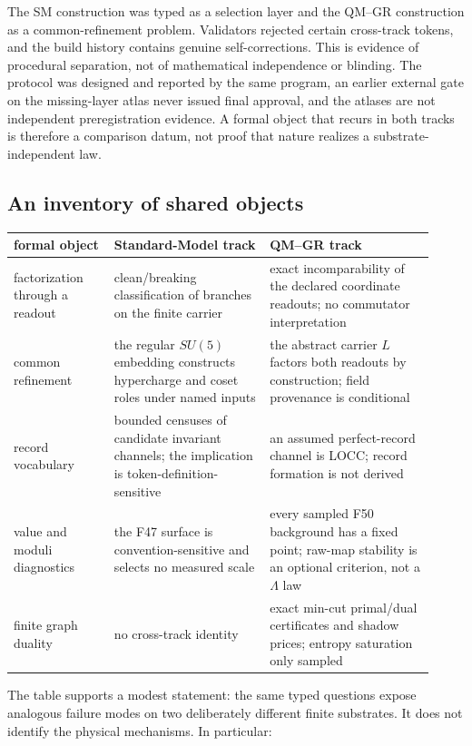 \documentclass[11pt]{article}
\theoremstyle{definition}
\begin{document}
The SM construction was typed as a selection layer and the QM--GR construction as a common-refinement problem.
Validators rejected certain cross-track tokens, and the build history contains genuine self-corrections. This is
evidence of procedural separation, not of mathematical independence or blinding. The protocol was designed and
reported by the same program, an earlier external gate on the missing-layer atlas never issued final approval, and
the atlases are not independent preregistration evidence. A formal object that recurs in both tracks is therefore a
comparison datum, not proof that nature realizes a substrate-independent law.

\subsection{An inventory of shared objects}\label{the-cross-track-ties}

\begin{center}
\small
\begin{longtable}[]{@{}p{0.22\linewidth}p{0.34\linewidth}p{0.36\linewidth}@{}}
\toprule
formal object & Standard-Model track & QM--GR track\\
\midrule
\endhead
factorization through a readout & clean/breaking classification of branches on the finite carrier & exact
incomparability of the declared coordinate readouts; no commutator interpretation\\
common refinement & the regular \(SU(5)\) embedding constructs hypercharge and coset roles under named inputs & the
abstract carrier \(L\) factors both readouts by construction; field provenance is conditional\\
record vocabulary & bounded censuses of candidate invariant channels; the implication is token-definition-sensitive &
an assumed perfect-record channel is LOCC; record formation is not derived\\
value and moduli diagnostics & the F47 surface is convention-sensitive and selects no measured scale & every sampled F50
background has a fixed point; raw-map stability is an optional criterion, not a \(\Lambda\) law\\
finite graph duality & no cross-track identity & exact min-cut primal/dual certificates and shadow prices; entropy
saturation only sampled\\
\bottomrule
\end{longtable}
\end{center}

The table supports a modest statement: the same typed questions expose analogous failure modes on two deliberately
different finite substrates. It does not identify the physical mechanisms. In particular:
\end{document}
